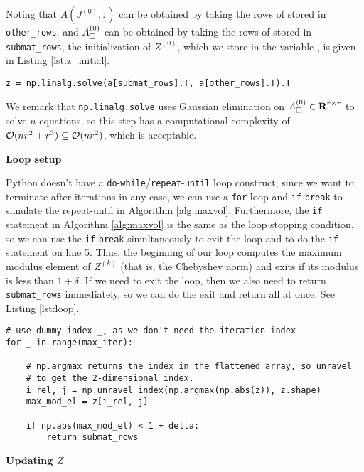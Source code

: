 \documentclass{article}
\begin{document}
	Noting that $A\left(J^{(0)}, :\right)$ can be obtained by taking the rows of \va{} stored in \texttt{other\_rows}, and $A_\boxdot^{(0)}$ can be obtained by taking the rows of \va{} stored in \texttt{submat\_rows}, the initialization of $Z^{(0)}$, which we store in the variable \vz{}, is given in Listing \ref{lst:z_initial}.
	\begin{lstlisting}[caption={$Z^{(0)}$ initialization}, label=lst:z_initial]
z = np.linalg.solve(a[submat_rows].T, a[other_rows].T).T
	\end{lstlisting}
	We remark that \texttt{np.linalg.solve} uses Gaussian elimination on $A_\boxdot^{(0)} \in \textnormal{\bf R}^{r\times r}$ to solve $n$ equations, so this step has a computational complexity of $\mathcal{O}(nr^2 + r^3) \subseteq \mathcal{O}(nr^2)$, which is acceptable.
	
	\textbf{Loop setup}
	
	Python doesn't have a \texttt{do}-\texttt{while}/\texttt{repeat}-\texttt{until} loop construct; since we want to terminate after \vmaxiter{} iterations in any case, we can use a \texttt{for} loop and \texttt{if}-\texttt{break} to simulate the repeat-until in Algorithm \ref{alg:maxvol}. Furthermore, the \texttt{if} statement in Algorithm \ref{alg:maxvol} is the same as the loop stopping condition, so we can use the \texttt{if}-\texttt{break} simultaneously to exit the loop and to do the \texttt{if} statement on line 5. Thus, the beginning of our loop computes the maximum modulus element of $Z^{(k)}$ (that is, the Chebyshev norm) and exits if its modulus is less than $1 + \delta$. If we need to exit the loop, then we also need to return \texttt{submat\_rows} immediately, so we can do the exit and return all at once. See Listing \ref{lst:loop}.
	\begin{lstlisting}[caption={loop setup}, label=lst:loop]
# use dummy index _, as we don't need the iteration index
for _ in range(max_iter):

    # np.argmax returns the index in the flattened array, so unravel
    # to get the 2-dimensional index.
    i_rel, j = np.unravel_index(np.argmax(np.abs(z)), z.shape)
    max_mod_el = z[i_rel, j]
    
    if np.abs(max_mod_el) < 1 + delta:
        return submat_rows
	\end{lstlisting}
	
	\textbf{Updating $Z$}
	
\end{document}
